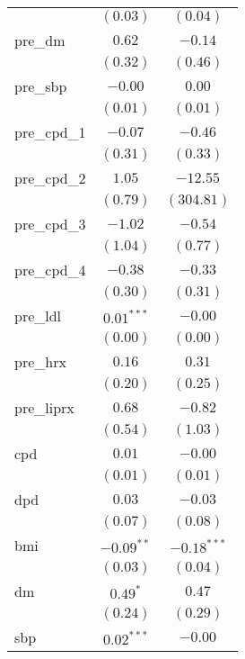 \begin{tabular}{l c c}
                 & $(0.03)$       & $(0.04)$      \\
pre\_dm          & $0.62$         & $-0.14$       \\
                 & $(0.32)$       & $(0.46)$      \\
pre\_sbp         & $-0.00$        & $0.00$        \\
                 & $(0.01)$       & $(0.01)$      \\
pre\_cpd\_1      & $-0.07$        & $-0.46$       \\
                 & $(0.31)$       & $(0.33)$      \\
pre\_cpd\_2      & $1.05$         & $-12.55$      \\
                 & $(0.79)$       & $(304.81)$    \\
pre\_cpd\_3      & $-1.02$        & $-0.54$       \\
                 & $(1.04)$       & $(0.77)$      \\
pre\_cpd\_4      & $-0.38$        & $-0.33$       \\
                 & $(0.30)$       & $(0.31)$      \\
pre\_ldl         & $0.01^{***}$   & $-0.00$       \\
                 & $(0.00)$       & $(0.00)$      \\
pre\_hrx         & $0.16$         & $0.31$        \\
                 & $(0.20)$       & $(0.25)$      \\
pre\_liprx       & $0.68$         & $-0.82$       \\
                 & $(0.54)$       & $(1.03)$      \\
cpd              & $0.01$         & $-0.00$       \\
                 & $(0.01)$       & $(0.01)$      \\
dpd              & $0.03$         & $-0.03$       \\
                 & $(0.07)$       & $(0.08)$      \\
bmi              & $-0.09^{**}$   & $-0.18^{***}$ \\
                 & $(0.03)$       & $(0.04)$      \\
dm               & $0.49^{*}$     & $0.47$        \\
                 & $(0.24)$       & $(0.29)$      \\
sbp              & $0.02^{***}$   & $-0.00$       \\

\end{tabular}
